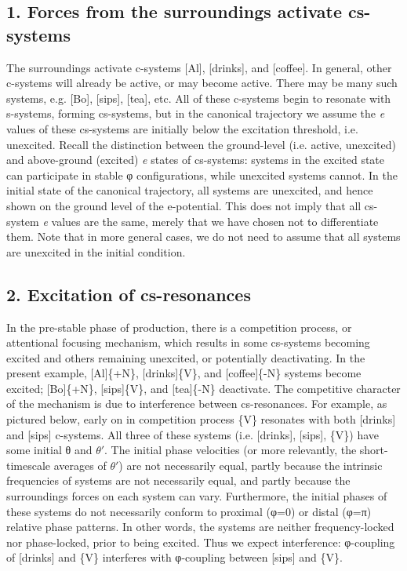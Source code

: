 \subsection{{1. Forces from the surroundings activate cs-systems}} 

The surroundings activate c-systems [Al], [drinks], and [coffee]. In general, other c-systems will already be active, or may become active. There may be many such systems, e.g. [Bo], [sips], [tea], etc. All of these c-systems begin to resonate with s-systems, forming cs-systems, but in the canonical trajectory we assume the \textit{e} values of these cs-systems are initially below the excitation threshold, i.e. unexcited. Recall the distinction between the ground-level (i.e. active, unexcited) and above-ground (excited) \textit{e} states of cs-systems: systems in the excited state can participate in stable φ configurations, while unexcited systems cannot. In the initial state of the canonical trajectory, all systems are unexcited, and hence shown on the ground level of the e-potential. This does not imply that all cs-system \textit{e} values are the same, merely that we have chosen not to differentiate them. Note that in more general cases, we do not need to assume that all systems are unexcited in the initial condition.

\subsection{2. Excitation of cs-resonances}

In the pre-stable phase of production, there is a competition process, or attentional focusing mechanism, which results in some cs-systems becoming excited and others remaining unexcited, or potentially deactivating. In the present example, [Al]\{+N\}, [drinks]\{V\}, and [coffee]\{-N\} systems become excited; [Bo]\{+N\}, [sips]\{V\}, and [tea]\{-N\} deactivate. The competitive character of the mechanism is due to interference between cs-resonances. For example, as pictured below, early on in competition process \{V\} resonates with both [drinks] and [sips] c-systems. All three of these systems (i.e. [drinks], [sips], \{V\}) have some initial θ and $\theta ′$. The initial phase velocities (or more relevantly, the short-timescale averages of $\theta ′$) are not necessarily equal, partly because the intrinsic frequencies of systems are not necessarily equal, and partly because the surroundings forces on each system can vary. Furthermore, the initial phases of these systems do not necessarily conform to proximal (φ=0) or distal (φ=π) relative phase patterns. In other words, the systems are neither frequency-locked nor phase-locked, prior to being excited. Thus we expect interference: φ{}-coupling of [drinks] and \{V\} interferes with φ{}-coupling between [sips] and \{V\}.

